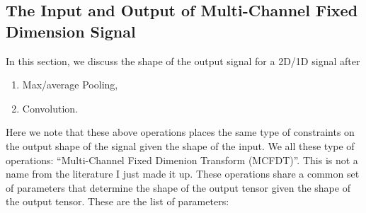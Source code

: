 \documentclass[]{article}
\theoremstyle{definition}
\numberwithin{equation}{subsection}
\begin{document}
    \subsection{The Input and Output of Multi-Channel Fixed Dimension Signal}
        In this section, we discuss the shape of the output signal for a 2D/1D signal after 
        \begin{enumerate}
            \item Max/average Pooling,
            \item Convolution. 
        \end{enumerate}
        Here we note that these above operations places the same type of constraints on the output shape of the signal given the shape of the input. 
        We all these type of operations: ``Multi-Channel Fixed Dimenion Transform (MCFDT)''. 
        This is not a name from the literature I just made it up. 
        These operations share a common set of parameters that determine the shape of the output tensor given the shape of the output tensor. 
        These are the list of parameters: 
\end{document}
